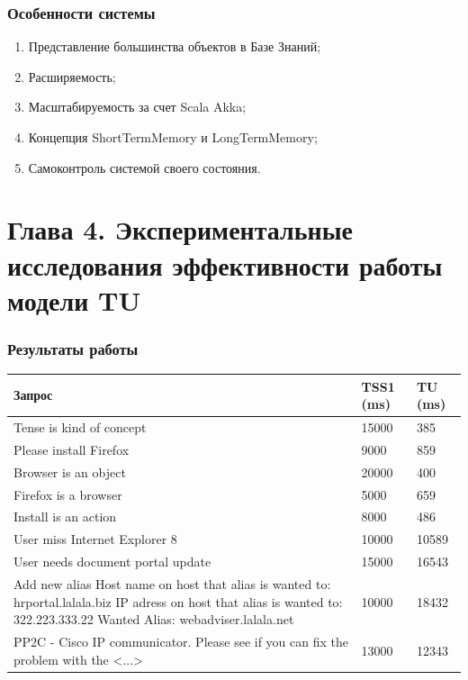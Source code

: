 \documentclass[14pt]{beamer}
\begin{document}
\begin{frame}
\frametitle{Особенности системы}
\begin{enumerate}
	\item Представление большинства объектов в Базе Знаний;
	\item Расширяемость;
	\item Масштабируемость за счет Scala Akka;
	\item Концепция ShortTermMemory и LongTermMemory;
	\item Самоконтроль системой своего состояния.
\end{enumerate}
\end{frame}


%
%
\section[Глава 4]{Глава 4. Экспериментальные исследования эффективности работы модели TU}



\begin{frame}
\frametitle{Результаты работы}
\begin{table}
	
\small
\begin{tabular} {|p{8cm}|p{1cm}|p{1cm}|}

\hline
\textbf{Запрос} & TSS1 (ms) & TU (ms) \\
\hline
  Tense is kind of concept & 15000 & 385 \\
  
  \hline
  Please install Firefox  & 9000 & 859 \\
  \hline
  Browser is an object   & 20000 & 400 \\
  \hline
  Firefox is a browser   & 5000 & 659  \\
  \hline
  Install is an action    & 8000 & 486 \\
  \hline
  User miss Internet Explorer 8     & 10000 & 10589 \\
  \hline
  User needs document portal update    & 15000 & 16543 \\
  \hline
  Add new alias Host name on host that alias is wanted to: hrportal.lalala.biz IP adress on host that alias is wanted to: 322.223.333.22 Wanted Alias:    webadviser.lalala.net    & 10000 & 18432  \\ 
  \hline
  PP2C - Cisco IP communicator. Please see if you can fix the problem with the <...> & 13000 & 12343 \\ 
   \hline
   \end{tabular}
\end{table}
\end{frame}
\end{document}
